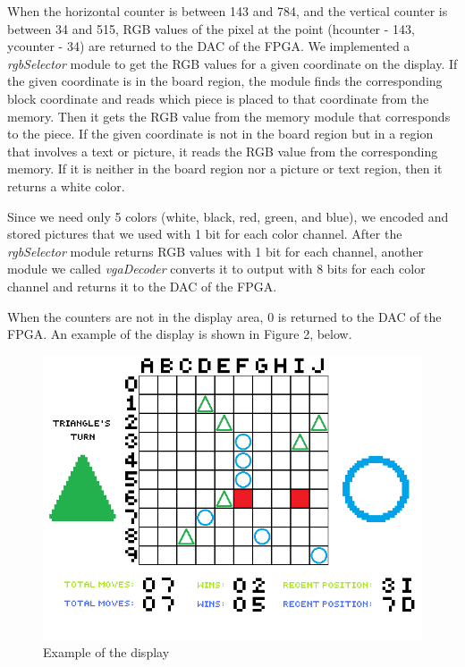 \documentclass[conference]{IEEEtran}
\begin{document}
\par When the horizontal counter is between 143 and 784, and the vertical counter is between 34 and 515, RGB values of the pixel at the point (hcounter - 143, ycounter - 34) are returned to the DAC of the FPGA. 
We implemented a \textit{rgbSelector} module to get the RGB values for a given coordinate on the display. 
If the given coordinate is in the board region, the module finds the corresponding block coordinate and reads which piece is 
placed to that coordinate from the memory. Then it gets the RGB value from the memory module that corresponds to the piece. 
If the given coordinate is not in the board region but in a region that involves a text or picture, it reads the RGB value from the corresponding memory. 
If it is neither in the board region nor a picture or text region, then it returns a white color. \\
\par Since we need only 5 colors (white, black, red, green, and blue), we encoded and stored pictures that we used with 1 bit for each color channel. 
After the \textit{rgbSelector} module returns RGB values with 1 bit for each channel, 
another module we called \textit{vgaDecoder} converts it to output with 8 bits for each color channel and returns it to the DAC of the FPGA. \\
\par When the counters are not in the display area, 0 is returned to the DAC of the FPGA. 
An example of the display is shown in Figure 2, below.  
\begin{figure}[H]
  \centerline{\includegraphics[scale=0.65, frame]{sample_board.png}}
   \caption{Example of the display}
\end{figure} 
\end{document}
